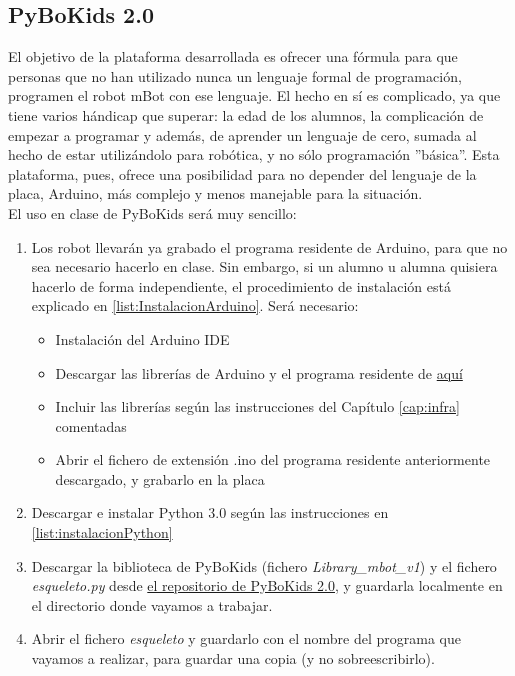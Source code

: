 \subsection{PyBoKids 2.0}
El objetivo de la plataforma desarrollada es ofrecer una fórmula para que personas que no han utilizado nunca un lenguaje formal de programación, programen el robot mBot con ese lenguaje. El hecho en sí es complicado, ya que tiene varios hándicap que superar: la edad de los alumnos, la complicación de empezar a programar y además, de aprender un lenguaje de cero, sumada al hecho de estar utilizándolo para robótica, y no sólo programación ''básica''. Esta plataforma, pues, ofrece una posibilidad para no depender del lenguaje de la placa, Arduino, más complejo y menos manejable para la situación. \\
El uso en clase de  PyBoKids será muy sencillo:
\begin{enumerate}
	\item Los robot llevarán ya grabado el programa residente de Arduino, para que no sea necesario hacerlo en clase. Sin embargo, si un alumno u alumna quisiera hacerlo de forma independiente, el procedimiento de instalación está explicado en \ref{list:InstalacionArduino}. Será necesario: 
	\begin{itemize}
		\item Instalación del Arduino IDE
		\item Descargar las librerías de Arduino y el programa residente de \href{https://github.com/JdeRobot/PyBoKids/tree/main/PyBoKids%202.0}{aquí}
		\item Incluir las librerías según las instrucciones del Capítulo \ref{cap:infra} comentadas
		\item Abrir el fichero de extensión .ino del programa residente anteriormente descargado, y grabarlo en la placa
	\end{itemize}
	\item Descargar e instalar Python 3.0 según las instrucciones en \ref{list:instalacionPython}
	\item Descargar la biblioteca de PyBoKids (fichero \textit{Library\_mbot\_v1}) y el fichero \textit{esqueleto.py} desde \href{https://github.com/JdeRobot/PyBoKids/tree/main/PyBoKids%202.0}{el repositorio de PyBoKids 2.0}, y guardarla localmente en el directorio donde vayamos a trabajar.	
	\item Abrir el fichero \textit{esqueleto} y guardarlo con el nombre del programa que vayamos a realizar, para guardar una copia (y no sobreescribirlo).
\end{enumerate}

